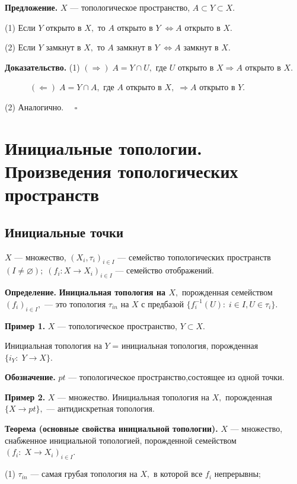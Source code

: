 \documentclass[12pt,a4paper]{article}
\begin{document}
\textbf{Предложение.} $X$ --- топологическое пространство, $A \subset Y \subset X.$ 

(1) Если $Y$ открыто в $X,$ то $A$ открыто в $Y \; \Leftrightarrow A$ открыто в $X.$

(2) Если $Y$ замкнут в $X,$ то $A$ замкнут в $Y \; \Leftrightarrow A$ замкнут в $X.$

\textbf{Доказательство.} (1) $(\Rightarrow) \; A = Y \cap U,$ где $U$ открыто в $X \Rightarrow A$ открыто в $X.$

$\quad \quad \quad (\Leftarrow) \; A = Y \cap A,$ где $A$ открыто в $X, \; \Rightarrow A$ открыто в $Y.$ 

(2) Аналогично. $\quad \square$ 

\section{Инициальные топологии. Произведения топологических пространств}

\subsection{Инициальные точки} 

$X$ --- множество, $(X_{i}, \tau_{i})_{i \in I}$ --- семейство топологических пространств $(I \neq \varnothing); \; (f_{i}: X \to X_{i})_{i \in I}$ --- семейство отображений.

\textbf{Определение.} \textbf{Инициальная топология на $X,$} порожденная семейством $(f_{i})_{i \in I},$ --- это топология $\tau_{in}$ на $X$ с предбазой $\{f^{-1}_{i}(U): \; i \in I, U \in \tau_{i}\}.$ 

\textbf{Пример 1.} $X$ --- топологическое пространство, $Y \subset X.$

Инициальная топология на $Y$ = инициальная топология, порожденная $\{i_{Y}: \; Y \to X\}.$ 

\textbf{Обозначение.} $pt$ --- топологическое пространство,состоящее из одной точки.

\textbf{Пример 2.} $X$ --- множество. Инициальная топология на $X,$ порожденная $\{X \to pt\},$ --- антидискретная топология. 

\textbf{Теорема (основные свойства инициальной топологии).} $X$ --- множество, снабженное инициальной топологией, порожденной семейством $(f_{i}: \; X \to X_{i})_{i \in I}.$ 

(1) $\tau_{in}$ --- самая грубая топология на $X,$ в которой все $f_{i}$ непрерывны; 
\end{document}
